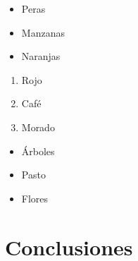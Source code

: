 		\begin{multicols}{3}
			\begin{itemize}[label={--}]
				\item Peras
				\item Manzanas
				\item Naranjas
			\end{itemize}

			\begin{enumerate}[label={*}]
				\item Rojo
				\item Café
				\item Morado
			\end{enumerate}

			\begin{itemize}
				\item Árboles
				\item Pasto
				\item Flores
			\end{itemize}
		\end{multicols}


\chapter{Conclusiones}

\lipsum[1]
\newp \lipsum[2]


 


